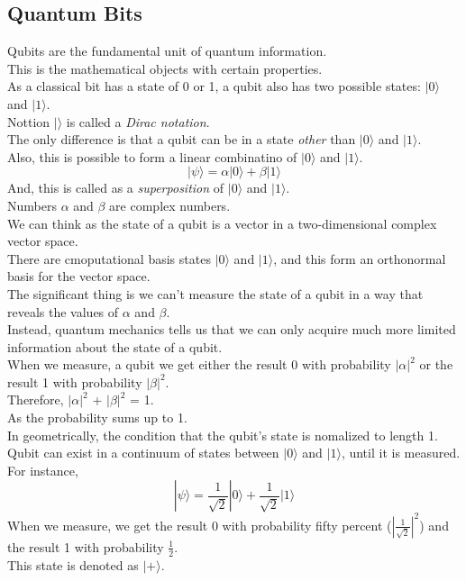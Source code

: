 \documentclass{article}
\begin{document}
\subsection{Quantum Bits}
Qubits are the fundamental unit of quantum information. \\
This is the mathematical objects with certain properties. \\
As a classical bit has a state of 0 or 1, a qubit also has two possible states: $|0\rangle$ and $|1\rangle$. \\
Nottion $|\rangle$ is called a \textit{Dirac notation}. \\
The only difference is that a qubit can be in a state \textit{other} than $|0\rangle$ and $|1\rangle$. \\
Also, this is possible to form a linear combinatino of $|0\rangle$ and $|1\rangle$. \\
\begin{equation}
    |\psi\rangle = \alpha |0\rangle + \beta |1\rangle
\end{equation}
And, this is called as a \textit{superposition} of $|0\rangle$ and $|1\rangle$. \\
Numbers $\alpha$ and $\beta$ are complex numbers. \\ We can think as the state of a qubit is a vector in a two-dimensional complex vector space. \\
There are cmoputational basis states $|0\rangle$ and $|1\rangle$, and this form an orthonormal basis for the vector space. \\
The significant thing is we can't measure the state of a qubit in a way that reveals the values of $\alpha$ and $\beta$. \\
Instead, quantum mechanics tells us that we can only acquire much more limited information about the state of a qubit. \\
When we measure, a qubit we get either the result 0 with probability $|\alpha|^2$ or the result 1 with probability $|\beta|^2$. \\
Therefore, $|\alpha|^2$ + $|\beta|^2$ = 1. \\ As the probability sums up to 1. \\
In geometrically, the condition that the qubit's state is nomalized to length 1. \\
Qubit can exist in a continuum of states between $|0\rangle$ and $|1\rangle$, until it is measured. \\
For instance, 
\begin{equation}
    |\psi\rangle = \frac{1}{\sqrt{2}} |0\rangle + \frac{1}{\sqrt{2}} |1\rangle
\end{equation}
When we measure, we get the result 0 with probability fifty percent ($|\frac{1}{\sqrt{2}}|^2$) and the result 1 with probability $\frac{1}{2}$. \\
This state is denoted as $|+\rangle$. \\
\end{document}
